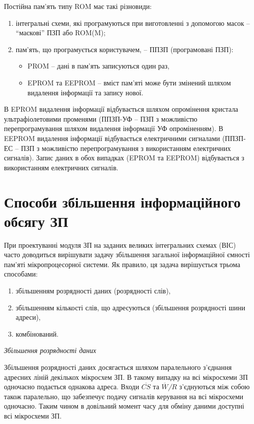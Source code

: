 \newpage

Постійна пам'ять типу ROM має такі різновиди:
\begin{enumerate}
\item інтегральні схеми, які програмуються при виготовленні з допомогою масок -- ``маскові'' ПЗП або ROM(M);
\item пам'ять, що програмується користувачем, -- ППЗП (програмовані ПЗП):
  {\begin{itemize}
  \item PROM -- дані в пам'ять записуються один раз,
  \item EPROM та EEPROM -- вміст пам'яті може бути змінений шляхом видалення інформації та запису нової.  
  \end{itemize}}
\end{enumerate}

В EPROM видалення інформації відбувається шляхом опромінення кристала ультрафіолетовими променями (ППЗП-УФ -- ПЗП з можливістю перепрограмування шляхом видалення інформації УФ опроміненням). В EEPROM видалення інформації відбувається електричними сигналами (ППЗП-ЕС -- ПЗП з можливістю перепрограмування з використанням електричних сигналів). Запис даних в обох випадках (EPROM та EEPROM) відбувається з використанням електричних сигналів.

\section{Способи збільшення інформаційного обсягу ЗП}

При проектуванні модуля ЗП на заданих великих інтегральних схемах  (ВІС) часто доводиться вирішувати задачу збільшення загальної інформаційної ємності пам'яті мікропроцесорної системи. Як правило, ця задача вирішується трьома способами: 

\begin{enumerate}
 \item{збільшенням розрядності даних (розрядності слів),}
 \item{збільшенням кількості слів, що адресуються (збільшення роз\-ряд\-нос\-ті шини адреси),}
 \item{комбінований.}
\end{enumerate}

\begin{center}
\textit{Збільшення розрядності даних}
\end{center}

Збільшення розрядності даних досягається шляхом паралельного з'єднання адресних ліній декількох мікросхем ЗП. В такому випадку на всі мікросхеми ЗП одночасно подається однакова адреса. Входи $\overline{CS}$ та \textit{$\overline{W}\!\!$/$R$} з'єднуються між собою також паралельно, що забезпечує подачу сигналів керування на всі мікросхеми одночасно. Таким чином в довільний момент часу для обміну даними доступні всі мікросхеми ЗП.

